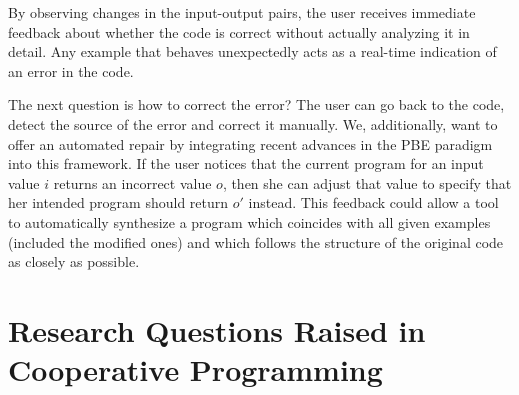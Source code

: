 By observing changes in the input-output pairs, the user receives immediate feedback about whether the code is correct without actually analyzing it in detail. Any example that behaves unexpectedly acts as a real-time indication of an error in the code. 

The next question is how to correct the error? The user can go back to the code, detect
the source of the error and correct it manually. We, additionally, want to offer an 
automated repair by integrating recent advances in the PBE paradigm into this framework.
If the user notices that the current program for an input value $i$ returns an incorrect value $o$, then she can adjust that value to specify that her intended program should return $o'$ instead. This feedback could allow a tool to automatically synthesize a program which coincides with all given examples (included the modified ones) and which follows the structure of the original code as closely as possible.


\section{Research Questions Raised in Cooperative Programming }


